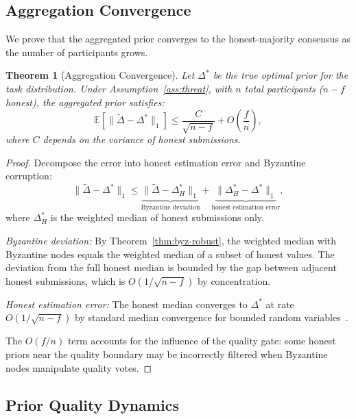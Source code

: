 \documentclass[11pt]{article}
\newtheorem{theorem}{Theorem}
\begin{document}
\subsection{Aggregation Convergence}

We prove that the aggregated prior converges to the honest-majority consensus
as the number of participants grows.

\begin{theorem}[Aggregation Convergence]
\label{thm:convergence}
Let $\Delta^*$ be the true optimal prior for the task distribution. Under
Assumption~\ref{ass:threat}, with $n$ total participants ($n - f$ honest), the
aggregated prior satisfies:
\begin{equation}
    \mathbb{E}\left[\|\tilde{\Delta} - \Delta^*\|_1\right]
    \leq \frac{C}{\sqrt{n - f}} + O\left(\frac{f}{n}\right),
\end{equation}
where $C$ depends on the variance of honest submissions.
\end{theorem}

\begin{proof}
Decompose the error into honest estimation error and Byzantine corruption:
\begin{equation}
    \|\tilde{\Delta} - \Delta^*\|_1
    \leq \underbrace{\|\tilde{\Delta} - \Delta_H^*\|_1}_{\text{Byzantine deviation}}
    + \underbrace{\|\Delta_H^* - \Delta^*\|_1}_{\text{honest estimation error}},
\end{equation}
where $\Delta_H^*$ is the weighted median of honest submissions only.

\textit{Byzantine deviation:} By Theorem~\ref{thm:byz-robust}, the weighted
median with Byzantine nodes equals the weighted median of a subset of honest
values. The deviation from the full honest median is bounded by the gap between
adjacent honest submissions, which is $O(1/\sqrt{n-f})$ by concentration.

\textit{Honest estimation error:} The honest median converges to $\Delta^*$ at
rate $O(1/\sqrt{n-f})$ by standard median convergence for bounded random
variables~\cite{minsker2015geometric}.

The $O(f/n)$ term accounts for the influence of the quality gate: some honest
priors near the quality boundary may be incorrectly filtered when Byzantine
nodes manipulate quality votes.
\end{proof}

\subsection{Prior Quality Dynamics}
\end{document}
